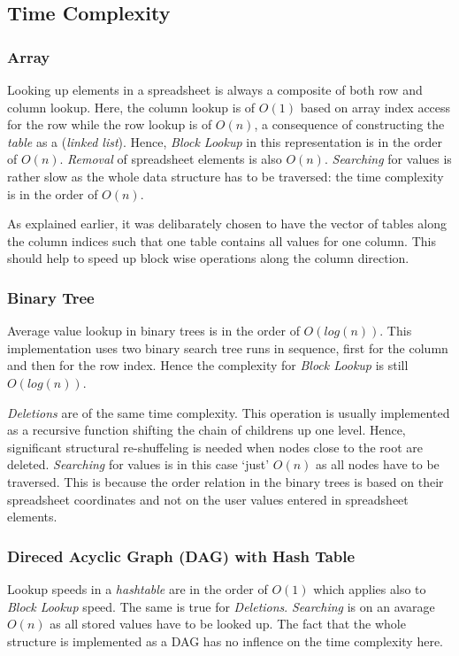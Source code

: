 \documentclass[a4paper,11pt,twoside]{article}
\begin{document}
\subsection{Time Complexity}
\subsubsection{Array}
Looking up elements in a spreadsheet is always a composite of both row
and column lookup. Here, the column lookup is of $O(1)$ based on array
index access for the row while the row lookup is of $O(n)$, a
consequence of constructing the \textit{table} as  a (\textit{linked
  list}). Hence, \emph{Block Lookup} in this representation 
is in the order of $O(n)$. \emph{Removal} of spreadsheet elements is
also $O(n)$. \emph{Searching} for values is rather slow as the whole
data structure has to be traversed: the time complexity is in the
order of $O(n)$.

As explained earlier, it was delibarately chosen to have the vector of tables
along the column indices such that one table contains all values for
one column. This should help to speed up block wise operations along
the column direction.

\subsubsection{Binary Tree}
Average value lookup in binary trees is in the order of
$O(log(n))$. This implementation uses two binary search tree runs in
sequence, first for the column and then for the row index. Hence the
complexity for \emph{Block Lookup} is still $O(log(n))$.

\emph{Deletions} are of the same time complexity. This operation is
usually implemented as a recursive function shifting the chain of
childrens up one level. Hence, significant structural re-shuffeling is
needed when nodes close to the root are deleted.  
\emph{Searching} for values is in this case `just' $O(n)$ as all
nodes have to be traversed. This is because the order relation in the
binary trees is based on their spreadsheet coordinates and not on the user
values entered in spreadsheet elements.


\subsubsection{Direced Acyclic Graph (DAG) with Hash Table}
Lookup speeds in a \textit{hashtable} are in the order of $O(1)$ which
applies also to \emph{Block Lookup} speed. The same is true for
\emph{Deletions}. \emph{Searching} is on an avarage $O(n)$ as all stored values
have to be looked up. The fact that the whole structure is implemented as a DAG has
no inflence on the time complexity here. 
\end{document}
